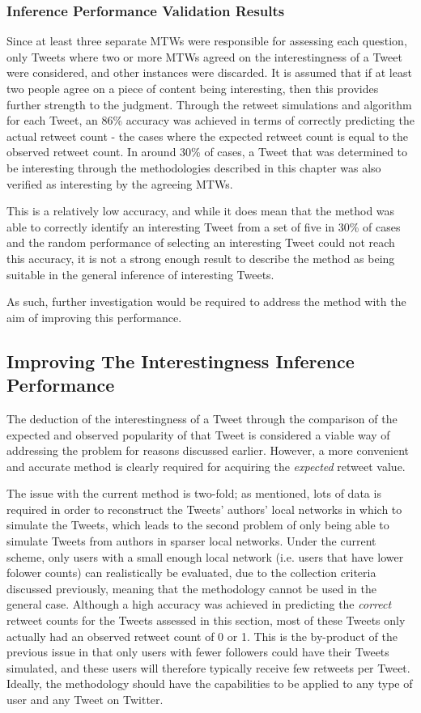 \subsubsection{Inference Performance Validation Results}
Since at least three separate MTWs were responsible for assessing each question, only Tweets where two or more MTWs agreed on the interestingness of a Tweet were considered, and other instances were discarded. It is assumed that if at least two people agree on a piece of content being interesting, then this provides further strength to the judgment. Through the retweet simulations and algorithm for each Tweet, an 86\% accuracy was achieved in terms of correctly predicting the actual retweet count - the cases where the expected retweet count is equal to the observed retweet count. In around 30\% of cases, a Tweet that was determined to be interesting through the methodologies described in this chapter was also verified as interesting by the agreeing MTWs.

This is a relatively low accuracy, and while it does mean that the method was able to correctly identify an interesting Tweet from a set of five in 30\% of cases and the random performance of selecting an interesting Tweet could not reach this accuracy, it is not a strong enough result to describe the method as being suitable in the general inference of interesting Tweets. 

As such, further investigation would be required to address the method with the aim of improving this performance.


\subsection{Improving The Interestingness Inference Performance}
The deduction of the interestingness of a Tweet through the comparison of the expected and observed popularity of that Tweet is considered a viable way of addressing the problem for reasons discussed earlier. However, a more convenient and accurate method is clearly required for acquiring the \textit{expected} retweet value.

The issue with the current method is two-fold; as mentioned, lots of data is required in order to reconstruct the Tweets' authors' local networks in which to simulate the Tweets, which leads to the second problem of only being able to simulate Tweets from authors in sparser local networks. Under the current scheme, only users with a small enough local network (i.e. users that have lower folower counts) can realistically be evaluated, due to the collection criteria discussed previously, meaning that the methodology cannot be used in the general case. Although a high accuracy was achieved in predicting the \textit{correct} retweet counts for the Tweets assessed in this section, most of these Tweets only actually had an observed retweet count of 0 or 1. This is the by-product of the previous issue in that only users with fewer followers could have their Tweets simulated, and these users will therefore typically receive few retweets per Tweet. Ideally, the methodology should have the capabilities to be applied to any type of user and any Tweet on Twitter.

